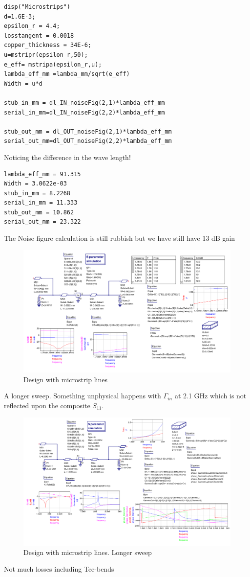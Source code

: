 \documentclass{article}
\begin{document}
\begin{verbatim}
disp("Microstrips")
d=1.6E-3;
epsilon_r = 4.4;
losstangent = 0.0018
copper_thickness = 34E-6;
u=mstripr(epsilon_r,50);
e_eff= mstripa(epsilon_r,u);
lambda_eff_mm =lambda_mm/sqrt(e_eff)
Width = u*d

stub_in_mm = dl_IN_noiseFig(2,1)*lambda_eff_mm
serial_in_mm=dl_IN_noiseFig(2,2)*lambda_eff_mm

stub_out_mm = dl_OUT_noiseFig(2,1)*lambda_eff_mm
serial_out_mm=dl_OUT_noiseFig(2,2)*lambda_eff_mm
\end{verbatim}
Noticing the difference in the wave length!
\begin{verbatim}
lambda_eff_mm = 91.315
Width = 3.0622e-03
stub_in_mm = 8.2268
serial_in_mm = 11.333
stub_out_mm = 10.862
serial_out_mm = 23.322
\end{verbatim}
The Noise figure calculation is still rubbish but we have still have 13 dB gain
\begin{figure}[H]
\centering
  \includegraphics[width=\linewidth]{1800MHzAt13dBAt2dBNF.png}
  \caption{Design with microstrip lines}
  \label{fig4}
\end{figure}
A longer sweep. Something unphysical happens with $\Gamma_{in}$ at 2.1 GHz which
is not reflected upon the composite $S_{11}$.


\begin{figure}[H]
\centering
  \includegraphics[width=\linewidth]{X1800MHzAt13dBAt2dBNFSweep.png}
  \caption{Design with microstrip lines. Longer sweep}
  \label{fig4}
\end{figure}
Not much losses including Tee-bends
\end{document}
